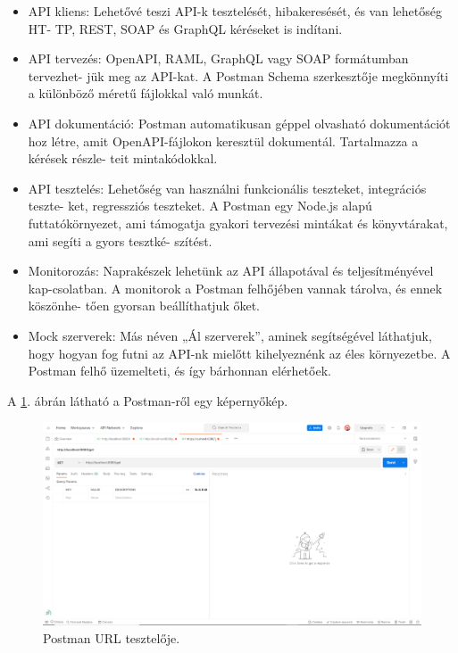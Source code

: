 \begin{itemize}
\item API kliens: Lehetővé teszi API-k tesztelését, hibakeresését, és van lehetőség 
HT-
TP, REST, SOAP és GraphQL kéréseket is indítani.
\item API tervezés: OpenAPI, RAML, GraphQL vagy SOAP formátumban tervezhet-
jük meg az API-kat. A Postman Schema szerkesztője megkönnyíti a különböző méretű fájlokkal való munkát.
\item API dokumentáció: Postman automatikusan géppel olvasható dokumentációt hoz létre, amit OpenAPI-fájlokon keresztül dokumentál. Tartalmazza a kérések részle-
teit mintakódokkal.
\item API tesztelés: Lehetőség van használni funkcionális teszteket, integrációs teszte-
ket, regressziós teszteket. A Postman egy Node.js alapú futtatókörnyezet, ami támogatja gyakori tervezési mintákat és  könyvtárakat, ami segíti a gyors tesztké-
szítést.
\item Monitorozás: Naprakészek lehetünk az API állapotával és teljesítményével kap-csolatban. A monitorok a Postman felhőjében vannak tárolva, és ennek köszönhe-
tően gyorsan beállíthatjuk őket.
\item Mock szerverek: Más néven „Ál szerverek”, aminek segítségével láthatjuk, hogy hogyan fog futni az API-nk mielőtt kihelyeznénk az éles környezetbe. A Postman felhő üzemelteti, és így bárhonnan elérhetőek.
\end{itemize}

A \ref{fig:Postman}. ábrán látható a Postman-ről egy képernyőkép.

\begin{figure}[h]
\centering
\includegraphics[scale=0.8]{images/Postman.png}
\caption{Postman URL tesztelője.}
\label{fig:Postman}
\end{figure}
\newpage

